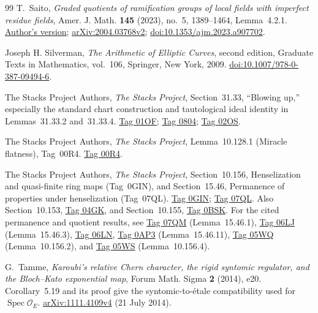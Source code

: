 \documentclass[11pt,a4paper]{amsart}
\numberwithin{equation}{section}
\theoremstyle{definition}
\theoremstyle{remark}
\newcommand{\OO}{\mathcal O}
\newcommand{\Spec}{\operatorname{Spec}}
\begin{document}
\begin{thebibliography}{99}
T.~Saito, \emph{Graded quotients of ramification groups of local fields with imperfect residue fields}, Amer. J. Math. \textbf{145} (2023), no.~5, 1389--1464, Lemma~4.2.1.
\href{https://preprint.press.jhu.edu/ajm/sites/default/files/AJM-saito.pdf}{Author's version};
\href{https://arxiv.org/abs/2004.03768v2}{arXiv:2004.03768v2};
\href{https://doi.org/10.1353/ajm.2023.a907702}{doi:10.1353/ajm.2023.a907702}.

Joseph H. Silverman,
\emph{The Arithmetic of Elliptic Curves},
second edition, Graduate Texts in Mathematics, vol.~106,
Springer, New York, 2009.
\href{https://doi.org/10.1007/978-0-387-09494-6}{doi:10.1007/978-0-387-09494-6}.

The Stacks Project Authors, \emph{The Stacks Project}, Section~31.33, ``Blowing up,'' especially the standard chart construction and tautological ideal identity in Lemmas~31.33.2 and~31.33.4.
\href{https://stacks.math.columbia.edu/tag/01OF}{Tag 01OF};
\href{https://stacks.math.columbia.edu/tag/0804}{Tag 0804};
\href{https://stacks.math.columbia.edu/tag/02OS}{Tag 02OS}.

The Stacks Project Authors, \emph{The Stacks Project}, Lemma~10.128.1 (Miracle flatness), Tag~00R4.
\href{https://stacks.math.columbia.edu/tag/00R4}{Tag 00R4}.

The Stacks Project Authors, \emph{The Stacks Project}, Section~10.156, Henselization and quasi-finite ring maps (Tag~0GIN), and Section~15.46, Permanence of properties under henselization (Tag~07QL).
\href{https://stacks.math.columbia.edu/tag/0GIN}{Tag 0GIN}; \href{https://stacks.math.columbia.edu/tag/07QL}{Tag 07QL}. Also Section~10.153, \href{https://stacks.math.columbia.edu/tag/04GK}{Tag 04GK}, and Section~10.155, \href{https://stacks.math.columbia.edu/tag/0BSK}{Tag 0BSK}.
For the cited permanence and quotient results, see
\href{https://stacks.math.columbia.edu/tag/07QM}{Tag 07QM}
(Lemma~15.46.1),
\href{https://stacks.math.columbia.edu/tag/06LJ}{Tag 06LJ}
(Lemma~15.46.3),
\href{https://stacks.math.columbia.edu/tag/06LN}{Tag 06LN},
\href{https://stacks.math.columbia.edu/tag/0AP3}{Tag 0AP3}
(Lemma~15.46.11),
\href{https://stacks.math.columbia.edu/tag/05WQ}{Tag 05WQ}
(Lemma~10.156.2), and
\href{https://stacks.math.columbia.edu/tag/05WS}{Tag 05WS}
(Lemma~10.156.4).

G.~Tamme, \emph{Karoubi's relative Chern character, the rigid syntomic regulator, and the Bloch--Kato exponential map},
Forum Math. Sigma \textbf{2} (2014), e20.
Corollary~5.19 and its proof give the syntomic-to-\'etale compatibility used for $\Spec\OO_E$.
\href{https://arxiv.org/abs/1111.4109v4}{arXiv:1111.4109v4}
(21 July 2014).


\end{thebibliography}
\end{document}
